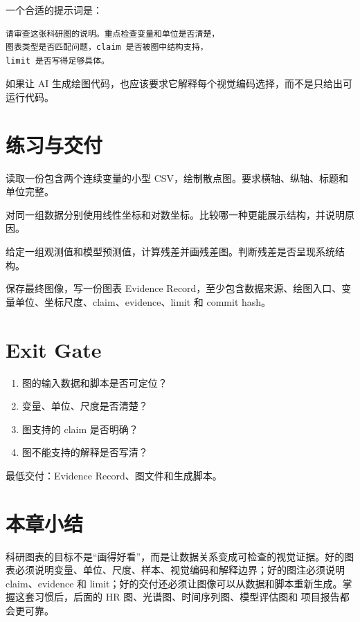 一个合适的提示词是：

\begin{lstlisting}[style=terminal]
请审查这张科研图的说明。重点检查变量和单位是否清楚，
图表类型是否匹配问题，claim 是否被图中结构支持，
limit 是否写得足够具体。
\end{lstlisting}

如果让 AI 生成绘图代码，也应该要求它解释每个视觉编码选择，而不是只给出可运行代码。

\section{练习与交付}

\begin{exercisebox}[基础练习]
读取一份包含两个连续变量的小型 CSV，绘制散点图。要求横轴、纵轴、标题和单位完整。
\end{exercisebox}

\begin{exercisebox}[尺度练习]
对同一组数据分别使用线性坐标和对数坐标。比较哪一种更能展示结构，并说明原因。
\end{exercisebox}

\begin{exercisebox}[诊断练习]
给定一组观测值和模型预测值，计算残差并画残差图。判断残差是否呈现系统结构。
\end{exercisebox}

\begin{exercisebox}[交付练习]
保存最终图像，写一份图表 Evidence Record，至少包含数据来源、绘图入口、变量单位、坐标尺度、claim、evidence、limit 和 commit hash。
\end{exercisebox}

\section{Exit Gate}

\begin{enumerate}
    \item 图的输入数据和脚本是否可定位？
    \item 变量、单位、尺度是否清楚？
    \item 图支持的 claim 是否明确？
    \item 图不能支持的解释是否写清？
\end{enumerate}

最低交付：Evidence Record、图文件和生成脚本。

\section{本章小结}

科研图表的目标不是“画得好看”，而是让数据关系变成可检查的视觉证据。好的图表必须说明变量、单位、尺度、样本、视觉编码和解释边界；好的图注必须说明 claim、evidence 和 limit；好的交付还必须让图像可以从数据和脚本重新生成。掌握这套习惯后，后面的 HR 图、光谱图、时间序列图、模型评估图和 项目报告都会更可靠。
